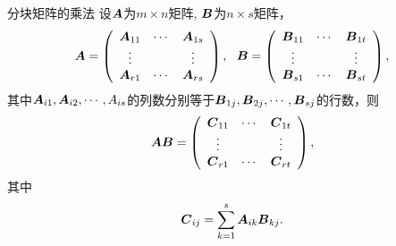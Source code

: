 \begin{frame}
  \begin{footnotesize}
    \begin{block}{分块矩阵的乘法}
            设$\boldsymbol{A}$为$m\times n$矩阵, $\boldsymbol{B}$为$n \times s$矩阵，
      $$
      \A = \left(
      \begin{array}{ccc}
        \A_{11} & \cd & \A_{1s} \\
        \vd   &     & \vd   \\
        \A_{r1} & \cd & \A_{rs}
      \end{array}
      \right), \ \ 
      \B = \left(
      \begin{array}{ccc}
        \B_{11} & \cd & \B_{1t} \\
        \vd   &     & \vd   \\
        \B_{s1} & \cd & \B_{st}
      \end{array}
      \right),
      $$
      其中$\boldsymbol{A}_{i1}, \boldsymbol{A}_{i2}, \cdots, A_{is}$的列数分别等于$\boldsymbol{B}_{1j}, \boldsymbol{B}_{2j}, \cdots, \boldsymbol{B}_{sj}$的行数，则
      $$
      \boldsymbol{A} \boldsymbol{B} = \left(
      \begin{array}{ccc}
        \boldsymbol{C}_{11}   & \cdots & \boldsymbol{C}_{1t}  \\
        \vdots   &     & \vdots   \\
        \boldsymbol{C}_{r1}   & \cdots & \boldsymbol{C}_{rt}
      \end{array}
      \right),
      $$
      其中
      $$
      \boldsymbol{C}_{ij} = \sum_{k=1}^s \boldsymbol{A}_{ik} \boldsymbol{B}_{kj}.
      $$
    \end{block}
    
  \end{footnotesize}

\end{frame}

